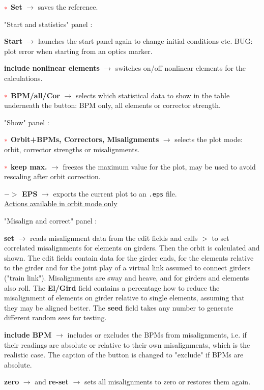 \documentclass[12pt]{article}
\newcommand{\redast}{{\color{red}\ast}}
\newcommand\code[1]{{\tt #1}}
\newcommand{\ofld}[1]{\colorbox{black!15}{{{\color{black}\bf #1}}}}
\newcommand\guico[1]{{\color{blue}\code{#1}}}
\newcommand{\unico}[1]{{\color{burntorange}\code{#1}}}
\newcommand{\evcod}[2]{\ofld{#1} $\rightarrow$ \guico{#2}}
\newcommand{\prcod}[2]{\opauni{#1}$>$\unico{#2}}
\newcommand{\opagui}[1]{\colorbox{blue!20}{{\color{black}\code{#1}}}}
\newcommand{\ogui}[1]{\hyperref[#1]{\opagui{#1}}}
\newcommand{\opauni}[1]{\colorbox{orange!30}{{\color{black}\code{#1}}}}
\newcommand{\todo}[1]{{\color{red} #1}}
\begin{document}
$\redast$ \evcod{Set}{butBPMrefClick} saves the reference.

"Start and statistics" panel \guico{panctr}:

\evcod{Start}{butStaClick} launches the \ogui{ostartmenu} start panel again to change initial conditions etc. \todo{BUG: plot error when starting from an optics marker.}

\evcod{include nonlinear elements}{chkSextClick} switches on/off nonlinear elements for the calculations.

$\redast$ \evcod{BPM/all/Cor}{butCODstatClick} selects which statistical data to show in the table underneath the button: BPM only, all elements or corrector strength.

"Show" panel \guico{panplo}:

$\redast$ \evcod{Orbit+BPMs, Correctors, Misalignments}{butplotOCClick} selects the plot mode: orbit, corrector strengths or misalignments.

$\redast$ \evcod{keep max.}{chkKeepMaxClick} freezes the maximum value for the plot, may be used to avoid rescaling after orbit correction.

\evcod{$-\!\!>$ EPS}{butEPSClick} exports the current plot to an \code{.eps} file.\\[1ex]


\underline{Actions available in orbit mode only}

"Misalign and correct" panel \guico{panmis}:

\evcod{set}{butMisalClick} reads misalignment data from the edit fields and calls  \prcod{georblib}{SetMisalignments} to set correlated misalignments for elements on girders. Then the orbit is calculated and shown. The edit fields contain data for the girder ends, for the elements relative to the girder and for the joint play of a virtual link assumed to connect girders ("train link"). Misalignments are sway and heave, and for girders and elements also roll. The \ofld{El/Gird} field contains a percentage how to reduce the misalignment of elements on girder relative to single elements, assuming that they may be aligned better. The \ofld{seed} field takes any number to generate different random sees for testing.

\evcod{include BPM}{butMonabsClick} includes or excludes the BPMs from misalignments, i.e. if their readings are absolute or relative to their own misalignments, which is the realistic case. The caption of the button is changed to "exclude" if BPMs are absolute.

\evcod{zero}{butZeroClick} and \evcod{re-set}{butSetAgainClick} sets all misalignments to zero or restores them again.
\end{document}
